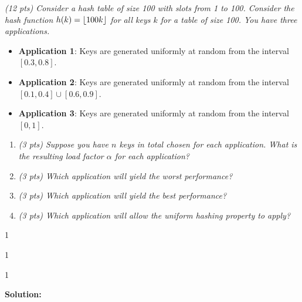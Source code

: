 \documentclass[9pt]{article}
\def\solutions{1}
\DeclarePairedDelimiter\floor{\lfloor}{\rfloor}
\begin{document}
\vspace{5mm}

\item { \itshape 
	    (12 pts) Consider a hash table of size 100 with slots from 1 to 100. Consider the hash function $h(k) = \floor*{100k}$ for all keys $k$ for a table of size 100. You have three applications.
	    \begin{itemize}
	        \item \textbf{Application 1}: Keys are  generated uniformly at random from the interval $[0.3, 0.8]$.
	        \item \textbf{Application 2}: Keys are  generated uniformly at random from the interval $[0.1, 0.4] \cup [0.6, 0.9]$.
	        \item \textbf{Application 3}: Keys are  generated uniformly at random from the interval $[0, 1]$.
	    \end{itemize}
	}
		\begin{enumerate}
		\item {\itshape (3 pts) Suppose you have $n$ keys in total chosen for each application. What is the resulting load factor $\alpha$ for each application? }
		
		\item {\itshape (3 pts) Which application will yield the worst performance? }
		
		\item {\itshape (3 pts) Which application will yield the best performance? }
		
		\item {\itshape (3 pts) Which application will allow the uniform hashing property to apply? }
		
    \end{enumerate}
\if\solutions1
\vspace{2mm}




\if\solutions1
\vspace{2mm}




\if\solutions1
\vspace{2mm}

\textbf{Solution:} \\


\fi

\newpage
\end{document}
